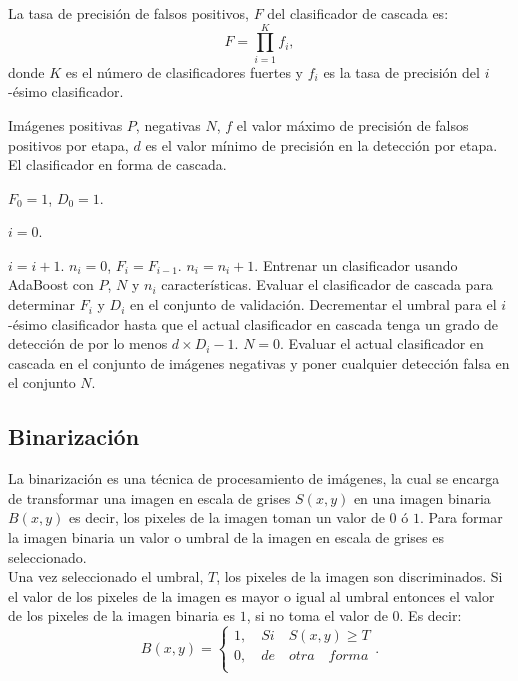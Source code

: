 La tasa de precisión de falsos positivos, $F$ del clasificador de cascada es: 
\begin{equation} \label{eq:F}
F = \prod^K_{i=1} f_i ,
\end{equation}
donde $K$ es el número de clasificadores fuertes y $f_i$ es la tasa de precisión del $i$-ésimo clasificador. 

\begin{algorithm}[h!]
\begin{algorithmic}[2]

\REQUIRE Imágenes positivas $P$, negativas $N$, $f$ el valor máximo de precisión de falsos positivos por etapa, $d$ es el valor mínimo de precisión en la detección por etapa. 
\ENSURE El clasificador en forma de cascada.  

\STATE  $F_0 = 1$, $D_0=1.$

\STATE  $i=0.$ 

	\STATE $i=i+1.$
	\STATE $n_i=0$, $F_i=F_{i-1}.$
		\STATE $n_i = n_i +1.$ 
		\STATE Entrenar un clasificador usando AdaBoost con $P$, $N$ y $n_i$ características. 
		\STATE Evaluar el clasificador de cascada para determinar $F_i$ y $D_i$ en el conjunto de validación. 
		\STATE Decrementar el umbral para el $i$-ésimo clasificador hasta que el actual clasificador en cascada tenga un grado 			de detección de por lo menos $d \times D_i-1$.
	\ENDWHILE
	\STATE $N=0.$ 
		\STATE Evaluar el actual clasificador en cascada en el conjunto de imágenes negativas y poner cualquier detección 				falsa en el conjunto $N$.
	\ENDIF

\ENDWHILE    
\caption{}\label{alg:Cascade} 
\end{algorithmic}
\end{algorithm} 


\subsection{Binarización}\label{subsec:Binarization} 

La binarización es una técnica de procesamiento de imágenes, la cual se encarga de transformar una imagen en escala de grises $S(x,y)$ en una imagen binaria $B(x,y)$ es decir, los pixeles de la imagen toman un valor de $0$ ó $1$. Para formar la imagen binaria un valor o umbral de la imagen en escala de grises es seleccionado. \\ 
Una vez seleccionado el umbral, $T$, los pixeles de la imagen son discriminados. Si el valor de los pixeles de la imagen es mayor o igual al umbral entonces el valor de los pixeles de la imagen binaria es $1$, si no toma el valor de $0$. Es decir: 
$$B(x,y)=
\begin{cases}   
1, \quad Si \quad S(x,y)\geq T \\
0, \quad de \quad otra \quad forma\\
\end{cases}.$$

